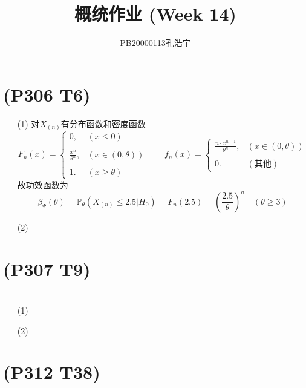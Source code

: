 \documentclass{article}
\title{概统作业 (Week 14)}
\author{PB20000113孔浩宇}
\begin{document}
\maketitle
\section{(P306 T6)}  %
\begin{enumerate}
    \item [(1)]对$X_{(n)}$有分布函数和密度函数
    \[
        F_{n} (x) = 
        \begin{cases}
            0 , & (x \leq 0)\\
            \\
            \displaystyle{\frac{x^n}{\theta^n}} , & (x\in (0,\theta))\\
            \\
            1 . & (x\geq \theta)
        \end{cases} 
        \qquad
        f_{n} (x) = 
        \begin{cases}
            \displaystyle{\frac{n\cdot x^{n-1}}{\theta^{n}}} , & (x\in (0 , \theta))\\
            \\
            0. & (\mbox{其他})
        \end{cases}    
    \]
    故功效函数为
    \[
        \beta_{\Psi }(\theta)
        = \mathbb{P}_{\theta} \left( X_{(n)} \leq 2.5 \big\vert H_{0} \right)  
        = F_{n} (2.5) 
        = {\left(\frac{2.5}{\theta}\right)}^{n}
        \quad (\theta \geq 3)
    \]
    \item [(2)]
\end{enumerate}

\section{(P307 T9)}  %


\section{}  %
\begin{enumerate}
    \item [(1)]
    \item [(2)]
\end{enumerate}

\section{(P312 T38)}  %



\section{}  %
\end{document}
